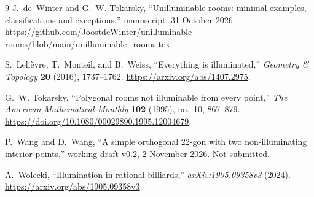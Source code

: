 \documentclass[11pt]{article}
\theoremstyle{remark}
\begin{document}
\begin{thebibliography}{9}
J.~de~Winter and G.~W. Tokarsky, ``Unilluminable rooms: minimal examples, classifications and exceptions,''
manuscript, 31 October 2026.
\url{https://github.com/JoostdeWinter/unilluminable-rooms/blob/main/unilluminable_rooms.tex}.

S.~Lelièvre, T.~Monteil, and B.~Weiss, ``Everything is illuminated,''
\emph{Geometry \& Topology} \textbf{20} (2016), 1737--1762.
\url{https://arxiv.org/abs/1407.2975}.

G.~W. Tokarsky, ``Polygonal rooms not illuminable from every point,''
\emph{The American Mathematical Monthly} \textbf{102} (1995), no.~10, 867--879.
\url{https://doi.org/10.1080/00029890.1995.12004679}.

P.~Wang and D.~Wang, ``A simple orthogonal 22-gon with two non-illuminating interior points,''
working draft v0.2, 2 November 2026. Not submitted.

A.~Wolecki, ``Illumination in rational billiards,''
\emph{arXiv:1905.09358v3} (2024).
\url{https://arxiv.org/abs/1905.09358v3}.
\end{thebibliography}
\end{document}
